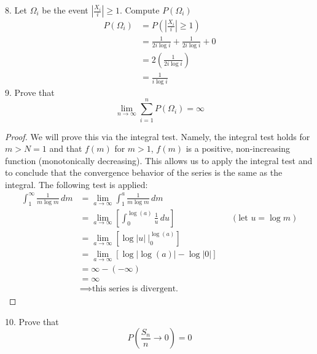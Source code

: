 \documentclass[11pt]{article}
\begin{document}
8. Let $\Omega_i$ be the event $\left| \frac{X_i}{i} \right| \ge 1$. Compute $P(\Omega_i)$ \\
\begin{align*}
	P(\Omega_i) &= P \left(\left| \frac{X_i}{i} \right| \ge 1 \right) \\
	&= \frac{1}{2i \log i} + \frac{1}{2i \log i} + 0 \\
	&=  2\left( \frac{1}{2i \log i} \right) \\
	&= \frac{1}{i \log i}
\end{align*}
9. Prove that
\begin{equation}
	\lim_{n \to \infty} \sum_{i=1}^{n} P(\Omega_i) = \infty
\end{equation}
\begin{proof}
	We will prove this via the integral test. Namely, the integral test holds for $m > N = 1$ and that $f(m)$ for $m > 1$, $f(m)$ is a positive, non-increasing function (monotonically decreasing). This allows us to apply the integral test and to conclude that the convergence behavior 
	of the series is the same as the integral. The following test is applied:
	\begin{align*}
		\int_{1}^\infty \frac{1}{m \log m} \,dm &= \lim_{a \to \infty} \int_{1}^{a} \frac{1}{m \log m} \,dm \\
		&= \lim_{a \to \infty} \left[ \int_{0}^{\log(a)} \frac{1}{u} \,du \right] &&(\text{let } u = \log m) \\
		&= \lim_{a \to \infty} \left[ \log|u|~\Big|_0^{\log(a)}\right] \\
		&= \lim_{a \to \infty} \left[ \log|\log(a)| - \log|0|\right] \\
		&= \infty - (-\infty) \\
		&= \infty \\
		& \implies \text{this series is divergent.}
	\end{align*}
\end{proof}
10. Prove that 
\begin{equation}
	P \left( \frac{S_n}{n} \to 0 \right) = 0
\end{equation}
\end{document}
